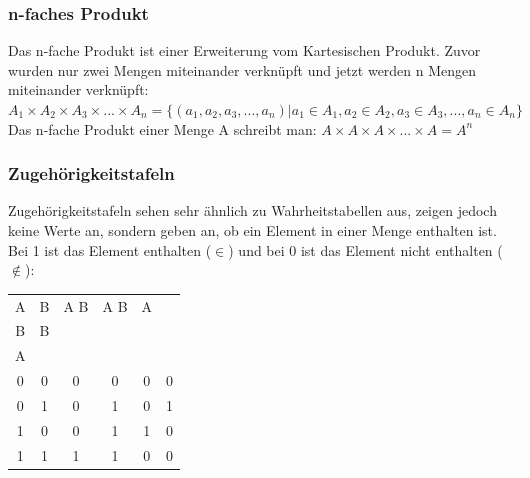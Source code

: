 \documentclass{article}
\begin{document}
	\subsubsection{n-faches Produkt}
	Das n-fache Produkt ist einer Erweiterung vom Kartesischen Produkt. Zuvor wurden nur zwei Mengen miteinander verknüpft und jetzt werden n Mengen miteinander verknüpft: $A_1\times A_2 \times A_3 \times ...\times A_n = \{(a_1, a_2, a_3,...,a_n)|a_1 \in A_1, a_2 \in A_2, a_3 \in A_3,...,a_n \in A_n\}$ \\
	Das n-fache Produkt einer Menge A schreibt man: $A\times A\times A\times...\times A = A^n$
	\subsubsection{Zugehörigkeitstafeln}
	Zugehörigkeitstafeln sehen sehr ähnlich zu Wahrheitstabellen aus, zeigen jedoch keine Werte an, sondern geben an, ob ein Element in einer Menge enthalten ist. Bei 1 ist das Element enthalten ($\in$) und bei 0 ist das Element nicht enthalten ($\notin$):\\
	\begin{tabular}{cccccc}
		\toprule
		A & B & A \cap B & A \cup B & A \\ B & B \\ A \\ \midrule
		0 & 0 & 0 & 0 & 0 & 0 \\ \hline
		0 & 1 & 0 & 1 & 0 & 1 \\ \hline
		1 & 0 & 0 & 1 & 1 & 0 \\ \hline
		1 & 1 & 1 & 1 & 0 & 0 \\
		\bottomrule
	\end{tabular}
\end{document}
